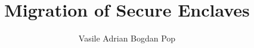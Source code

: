 \documentclass[language=english,version=final,mainfont=none,sharelatex=false]{utuftthesis}
\providecommand{\algorithmname}{Algoritmi}
\begin{document}
\title{Migration of Secure Enclaves}
\author{Vasile Adrian Bogdan Pop}

\maketitle


\tableofcontents

\listoffigures

\listoftables

\listofacronyms

\renewcommand{\algorithmname}{\listingscaption}


\begin{comment}
To better organize things, create a new tex hellllo file for each chapter
and input it below.

Avoid using the å, ä, ö or <space> characters in referred names and
underscores \_ in file names (may break hyperref).

Good luck!
\end{comment}








%
%


\printbibliography

\begin{comment}
Important! Create the appendix chapters with command \textbackslash appchapter\{some
name\} instead of \textbackslash chapter\{some name\} for the automagic
page counting to work!
\end{comment}
\end{document}
